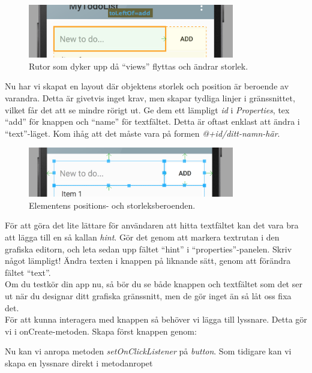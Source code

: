 \documentclass[11 pt, titlepage]{article} %
\begin{document}
\begin{figure}[ht!]
\centering
\includegraphics[width=90mm]{images/editing_layout.png}
\caption{Rutor som dyker upp då ``views'' flyttas och ändrar storlek.}
\label{overflow}
\end{figure}

Nu har vi skapat en layout där objektens storlek och position är beroende av varandra.
Detta är givetvis inget krav, men skapar tydliga linjer i gränssnittet, vilket får det att se mindre rörigt ut.
Ge dem ett lämpligt \textit{id} i \textit{Properties}, tex ``add'' för knappen och ``name'' för textfältet. Detta är oftast enklast att ändra i ``text''-läget.
Kom ihåg att det måste vara på formen \textit{@+id/ditt-namn-här}.\\

\begin{figure}[ht!]
\centering
\includegraphics[width=90mm]{images/layout.png}
\caption{Elementens positions- och storleksberoenden.}
\label{overflow}
\end{figure}

För att göra det lite lättare för användaren att hitta textfältet kan det vara bra att lägga till en så kallan \textit{hint}.
Gör det genom att markera textrutan i den grafiska editorn, och leta sedan upp fältet ``hint'' i ``properties''-panelen.
Skriv något lämpligt!
Ändra texten i knappen på liknande sätt, genom att förändra fältet ``text''. \\

Om du testkör din app nu, så bör du se både knappen och textfältet som det ser ut när du designar ditt grafiska gränssnitt, men de gör inget än så låt oss fixa det. \\

För att kunna interagera med knappen så behöver vi lägga till lyssnare. Detta gör vi i onCreate-metoden. Skapa först knappen genom: 

Nu kan vi anropa metoden \textit{setOnClickListener} på \textit{button}. Som tidigare kan vi skapa en lyssnare direkt i metodanropet

\end{document}
